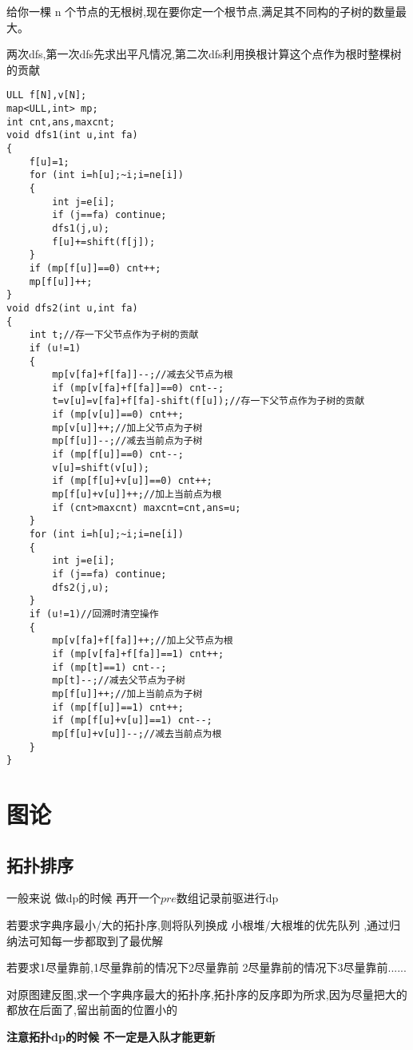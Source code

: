 \documentclass[a4paper]{ctexart}
\begin{document}
给你一棵 n 个节点的无根树,现在要你定一个根节点,满足其不同构的子树的数量最大。

两次dfs,第一次dfs先求出平凡情况,第二次dfs利用换根计算这个点作为根时整棵树的贡献

\begin{lstlisting}
ULL f[N],v[N];
map<ULL,int> mp;
int cnt,ans,maxcnt;
void dfs1(int u,int fa)
{
    f[u]=1;
    for (int i=h[u];~i;i=ne[i])
    {
        int j=e[i];
        if (j==fa) continue;
        dfs1(j,u);
        f[u]+=shift(f[j]);
    }
    if (mp[f[u]]==0) cnt++;
    mp[f[u]]++;
}
void dfs2(int u,int fa)
{
    int t;//存一下父节点作为子树的贡献
    if (u!=1)
    {
        mp[v[fa]+f[fa]]--;//减去父节点为根
        if (mp[v[fa]+f[fa]]==0) cnt--;
        t=v[u]=v[fa]+f[fa]-shift(f[u]);//存一下父节点作为子树的贡献
        if (mp[v[u]]==0) cnt++;
        mp[v[u]]++;//加上父节点为子树
        mp[f[u]]--;//减去当前点为子树
        if (mp[f[u]]==0) cnt--;
        v[u]=shift(v[u]);
        if (mp[f[u]+v[u]]==0) cnt++;
        mp[f[u]+v[u]]++;//加上当前点为根
        if (cnt>maxcnt) maxcnt=cnt,ans=u;
    }
    for (int i=h[u];~i;i=ne[i])
    {
        int j=e[i];
        if (j==fa) continue;
        dfs2(j,u);
    }
    if (u!=1)//回溯时清空操作
    {
        mp[v[fa]+f[fa]]++;//加上父节点为根
        if (mp[v[fa]+f[fa]]==1) cnt++;
        if (mp[t]==1) cnt--;
        mp[t]--;//减去父节点为子树
        mp[f[u]]++;//加上当前点为子树
        if (mp[f[u]]==1) cnt++;
        if (mp[f[u]+v[u]]==1) cnt--;
        mp[f[u]+v[u]]--;//减去当前点为根
    }
}
\end{lstlisting}

\section{图论}

\subsection{拓扑排序}
一般来说 做dp的时候 再开一个$pre$数组记录前驱进行dp

若要求字典序最小/大的拓扑序,则将队列换成 小根堆/大根堆的优先队列 ,通过归纳法可知每一步都取到了最优解

若要求1尽量靠前,1尽量靠前的情况下2尽量靠前  2尽量靠前的情况下3尽量靠前......

对原图建反图,求一个字典序最大的拓扑序,拓扑序的反序即为所求,因为尽量把大的都放在后面了,留出前面的位置小的

\textbf{注意拓扑dp的时候 不一定是入队才能更新}
\end{document}

